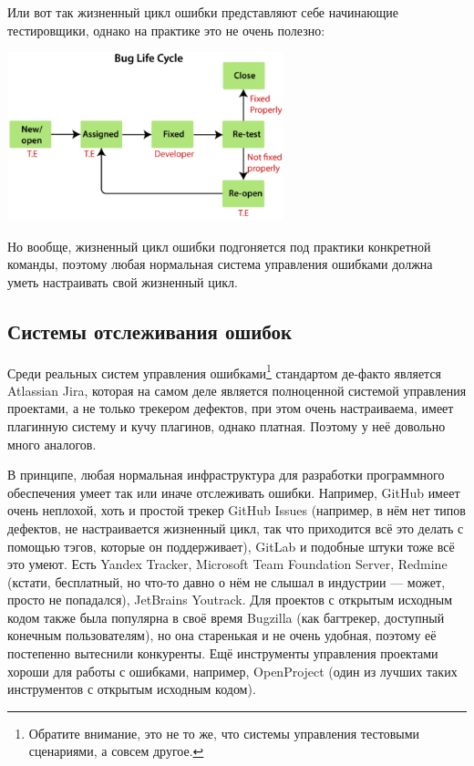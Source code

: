 \documentclass{../../text-style}
\begin{document}
Или вот так жизненный цикл ошибки представляют себе начинающие тестировщики, однако на практике это не очень полезно:

\begin{center}
    \includegraphics[width=0.6\textwidth]{bugLifecycle3.png}
\end{center}

Но вообще, жизненный цикл ошибки подгоняется под практики конкретной команды, поэтому любая нормальная система управления ошибками должна уметь настраивать свой жизненный цикл.

\subsection{Системы отслеживания ошибок}

Среди реальных систем управления ошибками\footnote{Обратите внимание, это не то же, что системы управления тестовыми сценариями, а совсем другое.} стандартом де-факто является Atlassian Jira, которая на самом деле является полноценной системой управления проектами, а не только трекером дефектов, при этом очень настраиваема, имеет плагинную систему и кучу плагинов, однако платная. Поэтому у неё довольно много аналогов. 

В принципе, любая нормальная инфраструктура для разработки программного обеспечения умеет так или иначе отслеживать ошибки. Например, GitHub имеет очень неплохой, хоть и простой трекер GitHub Issues (например, в нём нет типов дефектов, не настраивается жизненный цикл, так что приходится всё это делать с помощью тэгов, которые он поддерживает), GitLab и подобные штуки тоже всё это умеют. Есть Yandex Tracker, Microsoft Team Foundation Server, Redmine (кстати, бесплатный, но что-то давно о нём не слышал в индустрии --- может, просто не попадался), JetBrains Youtrack. Для проектов с открытым исходным кодом также была популярна в своё время Bugzilla (как багтрекер, доступный конечным пользователям), но она старенькая и не очень удобная, поэтому её постепенно вытеснили конкуренты. Ещё инструменты управления проектами хороши для работы с ошибками, например, OpenProject (один из лучших таких инструментов с открытым исходным кодом).
\end{document}
